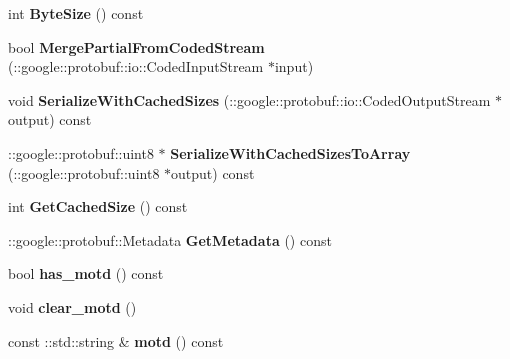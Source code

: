 \begin{DoxyCompactItemize}
\item 
\hypertarget{classSimpleChat_1_1ChatroomChange_afb166debf92f4dfaeb0d65f6fdd8072b}{int {\bfseries Byte\-Size} () const }\label{classSimpleChat_1_1ChatroomChange_afb166debf92f4dfaeb0d65f6fdd8072b}

\item 
\hypertarget{classSimpleChat_1_1ChatroomChange_aa9437c9c14d96c00433739014292dbd6}{bool {\bfseries Merge\-Partial\-From\-Coded\-Stream} (\-::google\-::protobuf\-::io\-::\-Coded\-Input\-Stream $\ast$input)}\label{classSimpleChat_1_1ChatroomChange_aa9437c9c14d96c00433739014292dbd6}

\item 
\hypertarget{classSimpleChat_1_1ChatroomChange_ab401eaeaae01c66c4792748817cfbc5b}{void {\bfseries Serialize\-With\-Cached\-Sizes} (\-::google\-::protobuf\-::io\-::\-Coded\-Output\-Stream $\ast$output) const }\label{classSimpleChat_1_1ChatroomChange_ab401eaeaae01c66c4792748817cfbc5b}

\item 
\hypertarget{classSimpleChat_1_1ChatroomChange_af517a0d9b374b6c1ea5590c04d4903b1}{\-::google\-::protobuf\-::uint8 $\ast$ {\bfseries Serialize\-With\-Cached\-Sizes\-To\-Array} (\-::google\-::protobuf\-::uint8 $\ast$output) const }\label{classSimpleChat_1_1ChatroomChange_af517a0d9b374b6c1ea5590c04d4903b1}

\item 
\hypertarget{classSimpleChat_1_1ChatroomChange_a9cfe098f8c073092260a1b0e3c6faf0b}{int {\bfseries Get\-Cached\-Size} () const }\label{classSimpleChat_1_1ChatroomChange_a9cfe098f8c073092260a1b0e3c6faf0b}

\item 
\hypertarget{classSimpleChat_1_1ChatroomChange_ac6866dca8930acff0d42cb9f5e5c72dd}{\-::google\-::protobuf\-::\-Metadata {\bfseries Get\-Metadata} () const }\label{classSimpleChat_1_1ChatroomChange_ac6866dca8930acff0d42cb9f5e5c72dd}

\item 
\hypertarget{classSimpleChat_1_1ChatroomChange_aff68232dec1990b23c7e190104609a3c}{bool {\bfseries has\-\_\-motd} () const }\label{classSimpleChat_1_1ChatroomChange_aff68232dec1990b23c7e190104609a3c}

\item 
\hypertarget{classSimpleChat_1_1ChatroomChange_a4638d80e7cf3a6d547f3f588693fc7d3}{void {\bfseries clear\-\_\-motd} ()}\label{classSimpleChat_1_1ChatroomChange_a4638d80e7cf3a6d547f3f588693fc7d3}

\item 
\hypertarget{classSimpleChat_1_1ChatroomChange_acb0ad5f0a69187317599b568d0891420}{const \-::std\-::string \& {\bfseries motd} () const }\label{classSimpleChat_1_1ChatroomChange_acb0ad5f0a69187317599b568d0891420}


\end{DoxyCompactItemize}
